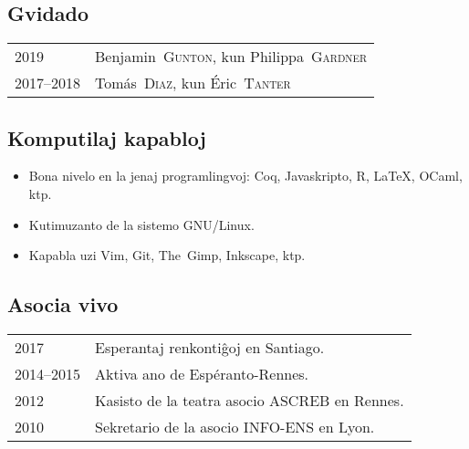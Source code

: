 \documentclass[12pt,a4paper]{article}
\makeatletter
\newenvironment{datecvsection}[1]%
               {\subsection*{#1}%
                 \noindent \begin{tabular}{@{}p{\annee}p{\texte}@{}}}
               {\end{tabular}}
\newenvironment{itemcvsection}[1]%
               {\subsection*{#1}\begin{itemize}}
               {\end{itemize}}
\newcommand\familyName{\textsc}
\newcommand\placeName{}
\makeatother
\begin{document}
\begin{datecvsection}{Gvidado}

    2019 & Benjamin~\familyName{Gunton}, kun Philippa~\familyName{Gardner} \\
    2017–2018 & Tomás~\familyName{Diaz}, kun Éric~\familyName{Tanter} \\

\end{datecvsection}

\begin{itemcvsection}{Komputilaj kapabloj}

  \item Bona nivelo en la jenaj programlingvoj:  Coq, Javaskripto, R, \LaTeX, OCaml, ktp.
  \item Kutimuzanto de la sistemo GNU/Linux.
  \item Kapabla uzi Vim, Git, The~Gimp, Inkscape, ktp.

\end{itemcvsection}

\begin{datecvsection}{Asocia vivo}

    2017 & Esperantaj renkontiĝoj en \placeName{Santiago}. \\
    2014–2015 & Aktiva ano de {Espéranto-Rennes}. \\
	2012 & Kasisto de la teatra asocio {ASCREB} en \placeName{Rennes}. \\
	2010 & Sekretario de la asocio \textsc{INFO-ENS} en \placeName{Lyon}.

\end{datecvsection}
\end{document}
